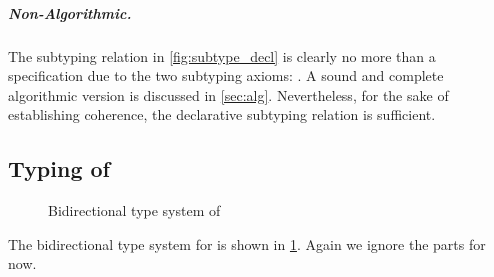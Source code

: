 \subparagraph{Non-Algorithmic.}
The subtyping relation in \cref{fig:subtype_decl} is clearly no more than a
specification due to the two subtyping axioms: . A sound
and complete algorithmic version is discussed in \cref{sec:alg}. Nevertheless,
for the sake of establishing coherence, the declarative subtyping relation is
sufficient.


\subsection{Typing of \name}


\begin{figure}[t]
  \centering
  \begin{small}
  \end{small}
  \caption{Bidirectional type system of \name}
  \label{fig:type_system}
\end{figure}

\renewcommand{\rulehl}[1]{#1}



The bidirectional type system for \name is shown in \cref{fig:type_system}.
Again we ignore the  parts for now.


\begin{comment}
Unlike the development of \oname, which first presents a type assignment
specification, \Cref{fig:type_system} directly present the bidirectional type
system of \name.
Unfortunately, we found that their declarative type
system is incoherent in nature (even with all the syntactic restrictions).
\jeremy{perhaps add a counter example somewhere?} Again, the reader is advised
to continue ignoring the gray-shaded parts until \cref{sec:elaboration}.
\tom{The above story is a bit confusing to me. Is it the case that the
     \oname paper already was aware of the coherence problem with its
     declarative type system and for that reason (and inference) presented
     a bidirection type system as well? If so, that's not clear.} \jeremy{I
     remember at one point Bruno and I believed the declarative system is
     coherent, it's just hard to prove. Then I found a counterexample. That was
     after \tname paper.  }
\end{comment}


